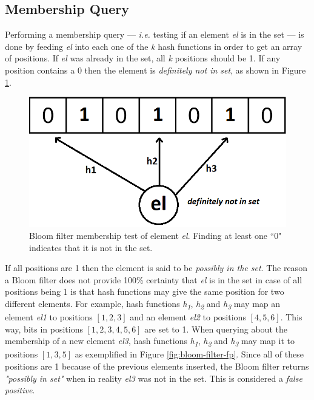 \subsection*{Membership Query}
Performing a membership query --- \textit{i.e.} testing if an element \textit{el} is in the set --- is done by feeding \textit{el} into each one of the \textit{k} hash functions in order to get an array of positions. If \textit{el} was already in the set, all \textit{k} positions should be 1. If any position contains a 0 then the element is \textit{definitely not in set}, as shown in Figure \ref{fig:bloom-filter}. 

\begin{figure}[!htb]
    \begin{center}
      \includegraphics[scale=0.3]{figures/query-bloom.png}
      \caption[Bloom filter membership query]{Bloom filter membership test of element \textit{el}. Finding at least one ``0" indicates that it is not in the set.}
      \label{fig:bloom-filter}
    \end{center}
\end{figure}

If all positions are 1 then the element is said to be \textit{possibly in the set}. The reason a Bloom filter does not provide 100\% certainty that \textit{el} is in the set in case of all positions being 1 is that hash functions may give the same position for two different elements. For example, hash functions \textit{h\textsubscript{1}}, \textit{h\textsubscript{2}} and \textit{h\textsubscript{3}} may map an element \textit{el1} to positions $[1,2,3]$ and an element \textit{el2} to positions $[4,5,6]$. This way, bits in positions $[1,2,3,4,5,6]$ are set to 1. When querying about the membership of a new element \textit{el3}, hash functions \textit{h\textsubscript{1}}, \textit{h\textsubscript{2}} and \textit{h\textsubscript{3}} may map it to positions $[1,3,5]$ as exemplified in Figure \ref{fig:bloom-filter-fp}. Since all of these positions are 1 because of the previous elements inserted, the Bloom filter returns \textit{"possibly in set"} when in reality \textit{el3} was not in the set. This is considered a \textit{false positive}.

